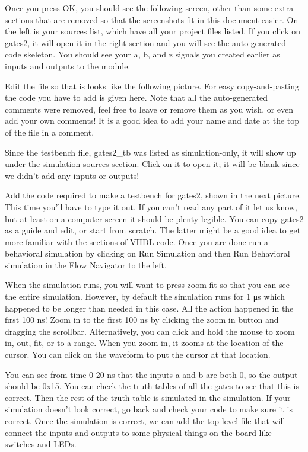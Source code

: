
Once you press OK, you should see the following screen, other than some extra sections that are
removed so that the screenshots fit in this document easier.
On the left is your sources list, which have all your project files listed.
If you click on gates2, it will open it in the right section and you will see the auto-generated
code skeleton.
You should see your a, b, and z signals you created earlier as inputs and outputs to the module.


Edit the file so that is looks like the following picture.
For easy copy-and-pasting the code you have to add is given here.
Note that all the auto-generated comments were removed, feel free to leave or remove them as
you wish, or even add your own comments! It is a good idea to add your name and date at the top
of the file in a comment.


Since the testbench file, gates2\_tb was listed as simulation-only, it will show up under the
simulation sources section.
Click on it to open it; it will be blank since we didn't add any inputs or outputs!


Add the code required to make a testbench for gates2, shown in the next picture.
This time you'll have to type it out.
If you can't read any part of it let us know, but at least on a computer screen it should be
plenty legible.
You can copy gates2 as a guide and edit, or start from scratch.
The latter might be a good idea to get more familiar with the sections of VHDL code.
Once you are done run a behavioral simulation by clicking on Run Simulation and then Run
Behavioral simulation in the Flow Navigator to the left.


When the simulation runs, you will want to press zoom-fit so that you can see the entire
simulation.
However, by default the simulation runs for 1 μs which happened to be longer than needed in
this case.
All the action happened in the first 100 ns!
Zoom in to the first 100 ns by clicking the zoom in button and dragging the scrollbar.
Alternatively, you can click and hold the mouse to zoom in, out, fit, or to a range.
When you zoom in, it zooms at the location of the cursor.
You can click on the waveform to put the cursor at that location.


You can see from time 0-20 ns that the inputs a and b are both 0, so the output should be 0x15.
You can check the truth tables of all the gates to see that this is correct.
Then the rest of the truth table is simulated in the simulation.
If your simulation doesn't look correct, go back and check your code to make sure it is correct.
Once the simulation is correct, we can add the top-level file that will connect the inputs and
outputs to some physical things on the board like switches and LEDs.

